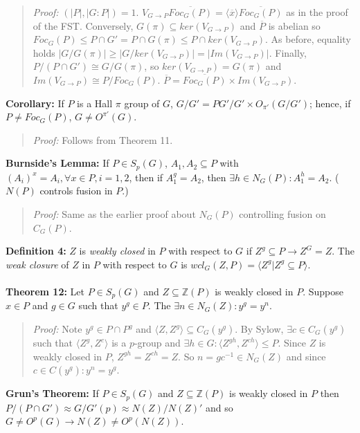 \begin{quote}
\emph{Proof:}  $(|P|,|G:P|) = 1$.  $V_{G \rightarrow P} {\overline {Foc_G(P)}} = \langle {\overline x} \rangle {\overline {Foc_G(P)}}$ as in the
proof of the FST.  Conversely, $G(\pi) \subseteq ker(V_{G \rightarrow P})$ and ${\overline P}$ is abelian so
$Foc_G(P) \leq P \cap G' = P \cap G(\pi) \leq P \cap ker(V_{G \rightarrow P})$.  As before, equality holds 
$|G/G(\pi)| \geq |G/ker(V_{G \rightarrow P})| = |Im(V_{G\rightarrow P})|$.
Finally, $P/(P \cap G') \cong G/G(\pi)$,
so $ker(V_{G \rightarrow P}) = G(\pi)$ and $Im(V_{G \rightarrow P}) \cong P/Foc_G(P)$.
${\overline P} = {\overline {Foc_G(P)}} \times Im(V_{G \rightarrow P})$.
\end{quote}
{\bf Corollary:} If $P$ is a Hall $\pi$
group of $G$, $G/G'= PG'/G' \times O_{\pi'}(G/G')$; hence, if $P \ne Foc_G(P)$,
$G \ne O^{\pi'}(G)$.
\begin{quote}
\emph{Proof:}  
Follows from Theorem 11.
\end{quote}
{\bf Burnside's Lemma:}  If $P \in S_p(G)$, $A_1, A_2 \subseteq P$ with 
$(A_i)^x = A_i, \forall x \in P, i= 1, 2$, then
if $A_1^g=A_2$, then $\exists h \in N_G(P): A_1^h=A_2$. ($N(P)$ controls fusion in $P$.)
\begin{quote}
\emph{Proof:}  
Same as the earlier proof about $N_G(P)$ controlling fusion on $C_G(P)$.
\end{quote}
{\bf Definition 4:}
$Z$ is \emph {weakly closed} in $P$ with respect to $G$ if $Z^g \subseteq P \rightarrow Z^G=Z$.
The \emph {weak closure} of $Z$ in $P$ with respect to $G$ is 
$wcl_G(Z, P)= \langle Z^g| Z^g \subseteq P \rangle$.
\\
\\
{\bf Theorem 12:}
Let $P \in S_p(G)$ and $Z \subseteq {\mathbb Z}(P)$ 
is weakly closed in $P$.  Suppose $x \in P$ and $g \in G$ such that
$y^g \in P$.  The $\exists n \in N_G(Z): y^g=y^n$.
\begin{quote}
\emph{Proof:}  
Note $y^g \in P \cap P^g$ and $ \langle Z, Z^g \rangle \subseteq C_G(y^g )$.  By Sylow,
$\exists c \in C_G(y^g )$ such that 
$ \langle Z^g, Z^c \rangle $ is a $p$-group and $\exists h \in G:
\langle Z^{gh}, Z^{ch} \rangle \le P$.  Since $Z$ is weakly closed in $P$, 
$Z^{gh}= Z^{ch}= Z$. So
$n= g c^{-1} \in N_G(Z)$ and since $c \in C(y^g): y^n= y^g$.
\end{quote}
{\bf Grun's Theorem:} If $P \in S_p(G)$ and $Z \subseteq {\mathbb Z}(P)$ 
is weakly closed in $P$ then
$P/(P \cap G') \approx G/G' (p) \approx N(Z)/N(Z)'$ and so 
$G \ne O^p(G) \rightarrow N(Z) \ne O^p(N(Z))$.
